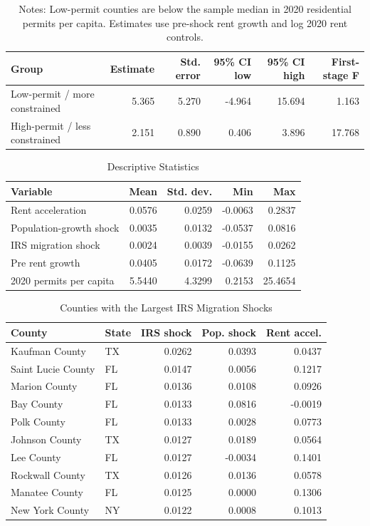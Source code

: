 \documentclass[11pt]{article}
\begin{document}
\begin{table}[h!]
\centering
\caption{Supply-Constraint Heterogeneity}
\label{tab:heterogeneity}
\small
\begin{tabular}{lrrrrr}
\toprule
Group & Estimate & Std. error & 95\% CI low & 95\% CI high & First-stage F \\
\midrule
Low-permit / more constrained & 5.365 & 5.270 & -4.964 & 15.694 & 1.163 \\
High-permit / less constrained & 2.151 & 0.890 & 0.406 & 3.896 & 17.768 \\
\bottomrule
\end{tabular}
\caption*{\footnotesize Notes: Low-permit counties are below the sample median in 2020 residential permits per capita. Estimates use pre-shock rent growth and log 2020 rent controls.}
\end{table}

\begin{table}[h!]
\centering
\caption{Descriptive Statistics}
\label{tab:desc}
\small
\begin{tabular}{lrrrr}
\toprule
Variable & Mean & Std. dev. & Min & Max \\
\midrule
Rent acceleration & 0.0576 & 0.0259 & -0.0063 & 0.2837 \\
Population-growth shock & 0.0035 & 0.0132 & -0.0537 & 0.0816 \\
IRS migration shock & 0.0024 & 0.0039 & -0.0155 & 0.0262 \\
Pre rent growth & 0.0405 & 0.0172 & -0.0639 & 0.1125 \\
2020 permits per capita & 5.5440 & 4.3299 & 0.2153 & 25.4654 \\
\bottomrule
\end{tabular}
\end{table}

\begin{table}[h!]
\centering
\caption{Counties with the Largest IRS Migration Shocks}
\label{tab:top}
\footnotesize
\begin{tabular}{llrrr}
\toprule
County & State & IRS shock & Pop. shock & Rent accel. \\
\midrule
Kaufman County & TX & 0.0262 & 0.0393 & 0.0437 \\
Saint Lucie County & FL & 0.0147 & 0.0056 & 0.1217 \\
Marion County & FL & 0.0136 & 0.0108 & 0.0926 \\
Bay County & FL & 0.0133 & 0.0816 & -0.0019 \\
Polk County & FL & 0.0133 & 0.0028 & 0.0773 \\
Johnson County & TX & 0.0127 & 0.0189 & 0.0564 \\
Lee County & FL & 0.0127 & -0.0034 & 0.1401 \\
Rockwall County & TX & 0.0126 & 0.0136 & 0.0578 \\
Manatee County & FL & 0.0125 & 0.0000 & 0.1306 \\
New York County & NY & 0.0122 & 0.0008 & 0.1013 \\
\bottomrule
\end{tabular}
\end{table}
\end{document}
